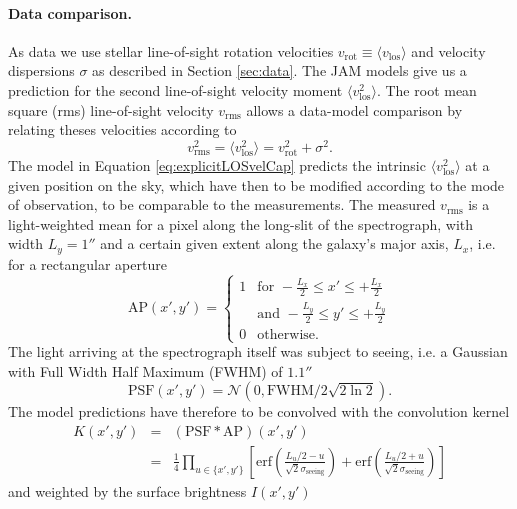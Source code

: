 \paragraph{Data comparison.} As data we use stellar line-of-sight rotation velocities $v_\text{rot} \equiv \langle v_\text{los} \rangle$ and velocity dispersions $\sigma$ as described in Section \ref{sec:data}. The JAM models give us a prediction for the second line-of-sight velocity moment $\langle v_\text{los}^2 \rangle$. The root mean square (rms) line-of-sight velocity $v_\text{rms}$ allows a data-model comparison by relating theses velocities according to 
\begin{equation*}
v_\text{rms}^2 = \langle v_\text{los}^2 \rangle = v_\text{rot}^2 + \sigma^2.
\end{equation*}
The model in Equation \ref{eq:explicitLOSvelCap} predicts the intrinsic $\langle v_\text{los}^2 \rangle$ at a given position on the sky, which have then to be modified according to the mode of observation, to be comparable to the measurements. The measured $v_\text{rms}$ is a light-weighted mean for a pixel along the long-slit of the spectrograph, with width $L_y = 1''$ \citep{SWELLSV} and a certain given extent along the galaxy's major axis, $L_x$, i.e. for a rectangular aperture
\begin{equation*}
\text{AP}(x',y') = \left\{ \begin{array}{ll} 1 & \text{for } -\frac{L_x}{2} \leq x' \leq + \frac{L_x}{2}\\
& \text{and } - \frac{L_y}{2} \leq y' \leq + \frac{L_y}{2}  \\ 0 & \text{otherwise.} \end{array} \right.
\end{equation*}
The light arriving at the spectrograph itself was subject to seeing, i.e. a Gaussian with Full Width Half Maximum (FWHM) of $1.1''$ \citep{SWELLSV}
\begin{equation*}
\text{PSF}(x',y')=\mathscr{N}(0,\text{FWHM}/2\sqrt{2\ln2}).
\end{equation*}
The model predictions have therefore to be convolved with the convolution kernel
\begin{eqnarray*}
K(x',y') &=& (\text{PSF} \ast \text{AP})(x',y') \\
&=& \frac{1}{4} \prod_{u \in \{x',y'\}} \left[ \text{erf}\left( \frac{L_u/2 - u}{\sqrt{2}\sigma_\text{seeing}}\right) + \text{erf} \left( \frac{L_u/2 + u}{\sqrt{2} \sigma_\text{seeing}} \right) \right]
\end{eqnarray*}
and weighted by the surface brightness $I(x',y')$
